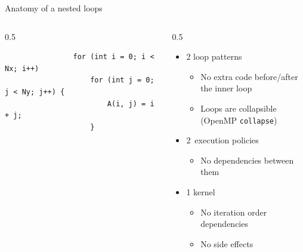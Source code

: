 \documentclass[
    aspectratio=169,
]{beamer}
\begin{document}
\begin{frame}[fragile]{Anatomy of a nested loops}
    \begin{columns}
        \begin{column}{0.5\linewidth}
            \begin{verbatim}
                for (int i = 0; i < Nx; i++)
                    for (int j = 0; j < Ny; j++) {
                        A(i, j) = i + j;
                    }
            \end{verbatim}
        \end{column}
        \begin{column}{0.5\linewidth}
            \begin{itemize}
                \item 2 loop patterns
                \begin{itemize}
                    \item No extra code before/after the inner loop
                    \item Loops are collapsible (OpenMP \texttt{collapse})
                \end{itemize}
                \item 2 execution policies
                \begin{itemize}
                    \item No dependencies between them
                \end{itemize}
                \item 1 kernel
                \begin{itemize}
                    \item No iteration order dependencies
                    \item No side effects
                \end{itemize}
            \end{itemize}
        \end{column}
    \end{columns}
\end{frame}
\end{document}
